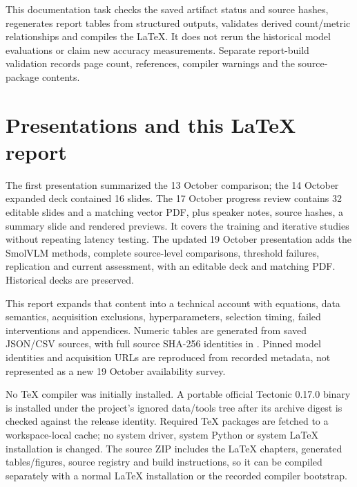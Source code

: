 This documentation task checks the saved artifact status and source hashes, regenerates report tables from structured outputs, validates derived count/metric relationships and compiles the LaTeX. It does not rerun the historical model evaluations or claim new accuracy measurements. Separate report-build validation records page count, references, compiler warnings and the source-package contents.

\section{Presentations and this LaTeX report}
The first presentation summarized the 13 October comparison; the 14 October expanded deck contained 16 slides. The 17 October progress review contains 32 editable slides and a matching vector PDF, plus speaker notes, source hashes, a summary slide and rendered previews. It covers the training and iterative studies without repeating latency testing. The updated 19 October presentation adds the SmolVLM methods, complete source-level comparisons, threshold failures, replication and current assessment, with an editable deck and matching PDF. Historical decks are preserved.

This report expands that content into a technical account with equations, data semantics, acquisition exclusions, hyperparameters, selection timing, failed interventions and appendices. Numeric tables are generated from saved JSON/CSV sources, with full source SHA-256 identities in . Pinned model identities and acquisition URLs are reproduced from recorded metadata, not represented as a new 19 October availability survey.

No TeX compiler was initially installed. A portable official Tectonic 0.17.0 binary is installed under the project's ignored data/tools tree after its archive digest is checked against the release identity. Required TeX packages are fetched to a workspace-local cache; no system driver, system Python or system LaTeX installation is changed. The source ZIP includes the LaTeX chapters, generated tables/figures, source registry and build instructions, so it can be compiled separately with a normal LaTeX installation or the recorded compiler bootstrap.


